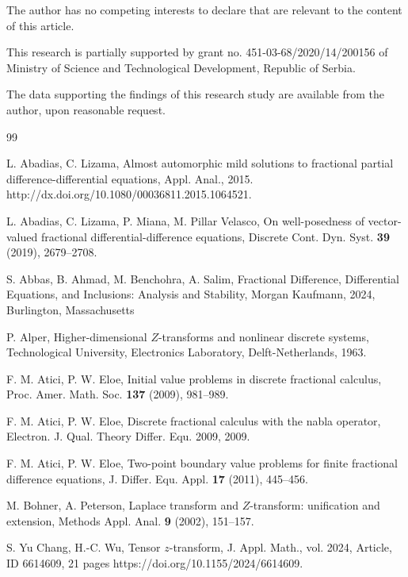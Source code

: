 \documentclass{amsart}
\theoremstyle{definition}
\theoremstyle{remark}
\numberwithin{equation}{section}
\begin{document}
 The author has no competing interests to declare that are relevant to the content of this article.\vspace{0.2cm}

This research is partially supported by grant no. 451-03-68/2020/14/200156 of Ministry
of Science and Technological Development, Republic of Serbia.\vspace{0.2cm}

 The data supporting the findings of this research study are available from
the author, upon reasonable request.

\begin{thebibliography}{99}

L. Abadias, C. Lizama,
Almost automorphic mild solutions to fractional partial
difference-differential equations,
Appl. Anal., 2015.
http://dx.doi.org/10.1080/00036811.2015.1064521.

L. Abadias, C. Lizama, P. Miana, M. Pillar Velasco,
On well-posedness of vector-valued fractional differential-difference equations,
Discrete Cont. Dyn. Syst. {\bf 39} (2019), 2679--2708.

S. Abbas, B. Ahmad, M. Benchohra, A. Salim,
Fractional Difference, Differential Equations, and Inclusions: Analysis and
Stability,
Morgan Kaufmann, 2024, Burlington, Massachusetts
 
P. Alper,
Higher-dimensional $Z$-transforms and nonlinear discrete systems,
Technological University, Electronics Laboratory, Delft-Netherlands, 1963.

F. M. Atici, P. W. Eloe,
Initial value problems in discrete fractional calculus,
Proc. Amer. Math. Soc. {\bf 137} (2009), 981--989.

F. M. Atici, P. W. Eloe,
Discrete fractional calculus with the nabla operator,
Electron. J. Qual. Theory Differ. Equ. 2009, 2009.

F. M. Atici, P. W. Eloe,
Two-point boundary value problems for finite fractional difference equations,
J. Differ. Equ. Appl. {\bf 17} (2011),
445--456.

M. Bohner, A. Peterson,
Laplace transform and $Z$-transform: unification and
extension,
Methods Appl. Anal. {\bf 9} (2002), 151--157.

S. Yu Chang, H.-C. Wu,
Tensor $z$-transform,
J. Appl. Math., vol. 2024, Article,  ID 6614609, 21 pages
https://doi.org/10.1155/2024/6614609.


\end{thebibliography}
\end{document}
